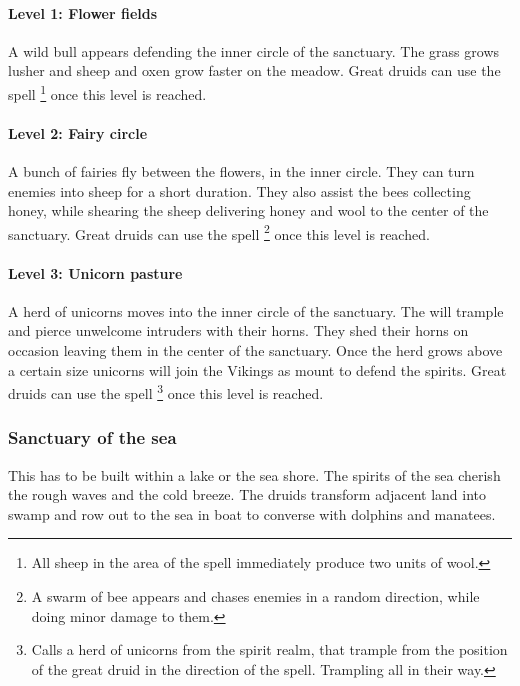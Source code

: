 \documentclass[a4paper]{book}
\begin{document}
			\paragraph{Level 1: Flower fields}
				A wild bull appears defending the inner circle of the sanctuary.
				The grass grows lusher and sheep and oxen grow faster on the meadow.
				Great druids can use the spell \footnote{
					All sheep in the area of the spell immediately produce two units of wool.
				} once this level is reached.

			\paragraph{Level 2: Fairy circle}
				A bunch of fairies fly between the flowers, in the inner circle.
				They can turn enemies into sheep for a short duration.
				They also assist the bees collecting honey,
				while shearing the sheep delivering honey and wool to the center of the sanctuary.
				Great druids can use the spell \footnote{
					A swarm of bee appears and chases enemies in a random direction,
					while doing minor damage to them.
				} once this level is reached.

			\paragraph{Level 3: Unicorn pasture}
				A herd of unicorns moves into the inner circle of the sanctuary.
				The will trample and pierce unwelcome intruders with their horns.
				They shed their horns on occasion leaving them in the center of the
				sanctuary.
				Once the herd grows above a certain size unicorns will join the \gls{Vikings}
				as mount to defend the spirits.
				Great druids can use the spell \footnote{
					Calls a herd of unicorns from the spirit realm,
					that trample from the position of the great druid
					in the direction of the spell.
					Trampling all in their way.
				} once this level is reached.

		\subsubsection{Sanctuary of the sea}
			This has to be built within a lake or the sea shore.
			The spirits of the sea cherish the rough waves and the cold breeze.
			The druids transform adjacent land into swamp and row out
			to the sea in boat to converse with dolphins and manatees.
\end{document}
